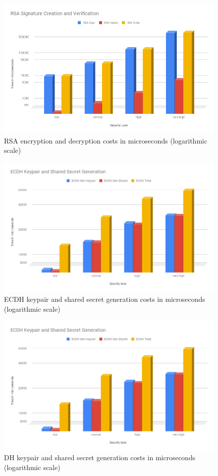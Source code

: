 				  \begin{figure}
					\centering
					\includegraphics[width=1.0\textwidth]{img/papi-rsa-sign-verify.png}
					\centering \caption{RSA encryption and decryption costs in microseconds (logarithmic scale)}
				  \end{figure}
  
				  \begin{figure}
					\centering
					\includegraphics[width=1.0\textwidth]{img/papi-ecdh-cost.png}
					\centering \caption{ECDH keypair and shared secret generation costs in microseconds (logarithmic scale)}
				  \end{figure}
  
				  \begin{figure}
					\centering
					\includegraphics[width=1.0\textwidth]{img/papi-ecdh-cost.png}
					\centering \caption{DH keypair and shared secret generation costs in microseconds (logarithmic scale)}
				  \end{figure}
  